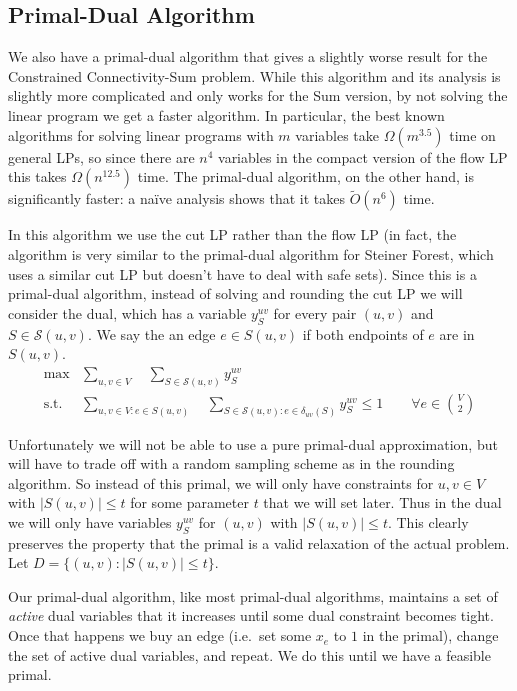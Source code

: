 \documentclass[11pt,letterpaper]{article}
\theoremstyle{definition}
\begin{document}
\subsection{Primal-Dual Algorithm} \label{sec:PD}

We also have a primal-dual algorithm that gives a slightly worse result for the {\sc Constrained Connectivity-Sum} problem.  While this algorithm and its analysis is slightly more complicated and only works for the Sum version, by not solving the linear program we get a faster algorithm.  In particular, the best known algorithms for solving linear programs with $m$ variables take $\Omega(m^{3.5})$ time on general LPs, so since there are $n^4$ variables in the compact version of the flow LP this takes $\Omega(n^{12.5})$ time.  The primal-dual algorithm, on the other hand, is significantly faster: a na\"{i}ve analysis shows that it takes $\tilde{O}(n^6)$ time.

In this algorithm we use the cut LP rather than the
flow LP (in fact, the algorithm is very similar to the primal-dual
algorithm for Steiner Forest, which uses a similar cut LP but doesn't
have to deal with safe sets).  Since this is a primal-dual algorithm,
instead of solving and rounding the cut LP we will consider the dual,
which has a variable $y_S^{uv}$ for every pair $(u,v)$ and $S \in
\mathcal{S}(u,v)$.  We say the an edge $e \in S(u,v)$ if both endpoints of $e$ are in $S(u,v)$.
\begin{align*}
\max &\sum_{u,v \in V} \quad \sum_{S \in \mathcal{S}(u,v)}
y_S^{uv} \\
\text{s.t. } &\sum_{u,v \in V : e \in S(u,v)}\quad \sum_{S \in
  \mathcal{S}(u,v) : e \in \delta_{uv}(S)} y_S^{uv} \leq 1 \qquad
\forall e \in {V \choose 2}
\end{align*}

Unfortunately we will not be able to use a pure primal-dual
approximation, but will have to trade off with a random sampling
scheme as in the rounding algorithm.  So instead of this primal, we
will only have constraints for $u,v \in V$ with $|S(u,v)| \leq t$ for
some parameter $t$ that we will set later.  Thus in the dual we will
only have variables $y_S^{uv}$  for $(u,v)$ with $|S(u,v)| \leq t$.
This clearly preserves the property that the primal is a valid
relaxation of the actual problem.  Let $D = \{(u,v) : |S(u,v)| \leq
t\}$.

Our primal-dual algorithm, like most primal-dual algorithms,
maintains a set of \emph{active} dual variables that it increases
until some dual constraint becomes tight.  Once that happens we buy an
edge (i.e.\ set some $x_e$ to $1$ in the primal), change the set of
active dual variables, and repeat.  We do this until we have a
feasible primal.
\end{document}
